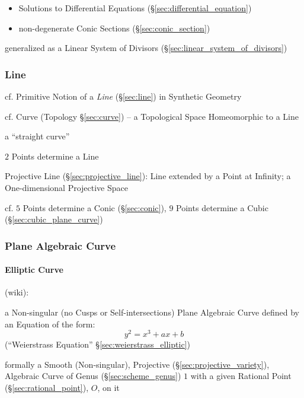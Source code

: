 \begin{itemize}
  \item Solutions to Differential Equations (\S\ref{sec:differential_equation})
  \item non-degenerate Conic Sections (\S\ref{sec:conic_section})
\end{itemize}

\fist generalized as a Linear System of Divisors
(\S\ref{sec:linear_system_of_divisors})



\subsubsection{Line}\label{sec:algebraic_line}

\fist cf. Primitive Notion of a \emph{Line} (\S\ref{sec:line}) in Synthetic
Geometry

\fist cf. Curve (Topology \S\ref{sec:curve}) -- a Topological Space Homeomorphic
to a Line

a ``straight curve''

$2$ Points determine a Line

\fist Projective Line (\S\ref{sec:projective_line}): Line extended by a Point at
Infinity; a One-dimensional Projective Space

cf. $5$ Points determine a Conic (\S\ref{sec:conic}), $9$ Points determine a
Cubic (\S\ref{sec:cubic_plane_curve})



\subsubsection{Plane Algebraic Curve}\label{sec:plane_algebraic_curve}

\paragraph{Elliptic Curve}\label{sec:elliptic_curve}\hfill

(wiki):

a Non-singular (no Cusps or Self-intersections) Plane Algebraic Curve defined
by an Equation of the form:
\[
  y^2 = x^3 + ax + b
\]
(``Weierstrass Equation'' \S\ref{sec:weierstrass_elliptic})

formally a Smooth (Non-singular), Projective (\S\ref{sec:projective_variety}),
Algebraic Curve of Genus (\S\ref{sec:scheme_genus}) $1$ with a given Rational
Point (\S\ref{sec:rational_point}), $O$, on it

